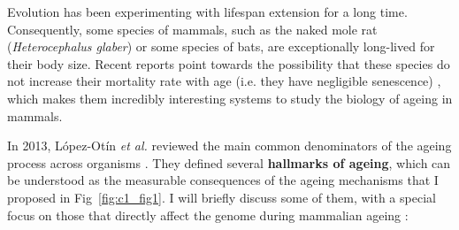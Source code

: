 \bigskip

Evolution has been experimenting with lifespan extension for a long time. Consequently, some species of mammals, such as the naked mole rat (\textit{Heterocephalus glaber}) or some species of bats, are exceptionally long-lived for their body size. Recent reports point towards the possibility that these species do not increase their mortality rate with age (i.e. they have negligible senescence) \cite{Ruby2018,Fleischer2017}, which makes them incredibly interesting systems to study the biology of ageing in mammals. 

\bigskip

In 2013, L\'opez-Ot\'in \textit{et al.} reviewed the main common denominators of the ageing process across organisms \cite{Lopez-Otin2013}. They defined several \textbf{hallmarks of ageing}, which can be understood as the measurable consequences of the ageing mechanisms that I proposed in Fig~\ref{fig:c1_fig1}. I will briefly discuss some of them, with a special focus on those that directly affect the genome during mammalian ageing  \cite{Lopez-Otin2013,Singh2019}:

